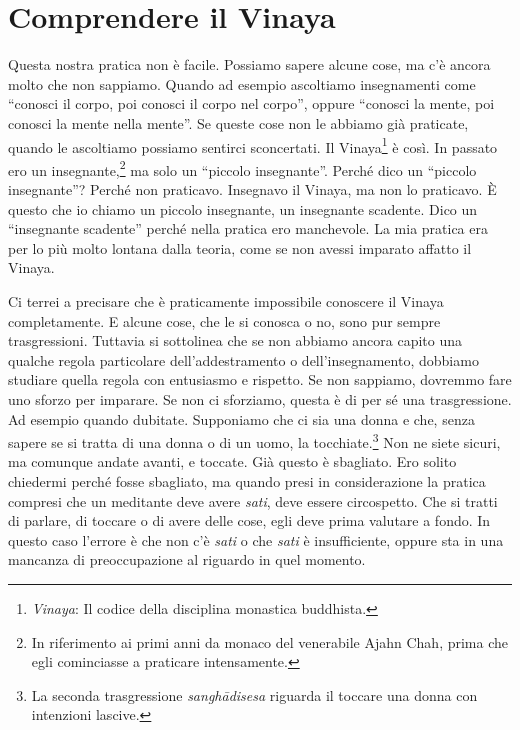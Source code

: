 \chapter{Comprendere il Vinaya}

Questa nostra pratica non è facile. Possiamo sapere alcune cose, ma c'è
ancora molto che non sappiamo. Quando ad esempio ascoltiamo insegnamenti
come ``conosci il corpo, poi conosci il corpo nel corpo'', oppure
``conosci la mente, poi conosci la mente nella mente''. Se queste cose
non le abbiamo già praticate, quando le ascoltiamo possiamo sentirci
sconcertati. Il Vinaya\footnote{\emph{Vinaya}: Il codice della disciplina
  monastica buddhista.} è così. In passato ero un insegnante,\footnote{In
  riferimento ai primi anni da monaco del venerabile Ajahn Chah, prima
  che egli cominciasse a praticare intensamente.} ma solo un ``piccolo
insegnante''. Perché dico un ``piccolo insegnante''? Perché non
praticavo. Insegnavo il Vinaya, ma non lo praticavo. È questo che io
chiamo un piccolo insegnante, un insegnante scadente. Dico un
``insegnante scadente'' perché nella pratica ero manchevole. La mia
pratica era per lo più molto lontana dalla teoria, come se non avessi
imparato affatto il Vinaya.

Ci terrei a precisare che è praticamente impossibile conoscere il Vinaya
completamente. E alcune cose, che le si conosca o no, sono pur sempre
trasgressioni. Tuttavia si sottolinea che se non abbiamo ancora capito
una qualche regola particolare dell'addestramento o dell'insegnamento,
dobbiamo studiare quella regola con entusiasmo e rispetto. Se non
sappiamo, dovremmo fare uno sforzo per imparare. Se non ci sforziamo,
questa è di per sé una trasgressione. Ad esempio quando dubitate.
Supponiamo che ci sia una donna e che, senza sapere se si tratta di una
donna o di un uomo, la tocchiate.\footnote{La seconda trasgressione
  \emph{sanghādisesa} riguarda il toccare una donna con intenzioni
  lascive.} Non ne siete sicuri, ma comunque andate avanti, e toccate.
Già questo è sbagliato. Ero solito chiedermi perché fosse sbagliato, ma
quando presi in considerazione la pratica compresi che un meditante deve
avere \emph{sati}, deve essere circospetto. Che si tratti di parlare, di
toccare o di avere delle cose, egli deve prima valutare a fondo. In
questo caso l'errore è che non c'è \emph{sati} o che \emph{sati} è
insufficiente, oppure sta in una mancanza di preoccupazione al riguardo
in quel momento.

